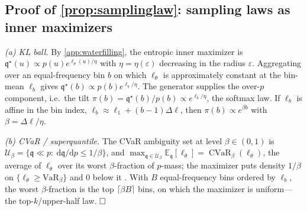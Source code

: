 \documentclass{article}
\theoremstyle{plain}
\theoremstyle{definition}
\theoremstyle{remark}
\DeclareMathOperator{\CVaR}{CVaR}
\newcommand{\E}{\mathbb{E}}
\newcommand{\state}{u}
\newcommand{\lossf}{\ell_\theta}
\newcommand{\pnat}{p}
\begin{document}
\subsection{Proof of \cref{prop:samplinglaw}: sampling laws as inner maximizers}\label{app:samplinglaw}
\emph{(a) KL ball.} By \cref{app:waterfilling}, the entropic inner maximizer is
$\mathfrak q^\star(\state)\propto\pnat(\state)e^{\lossf(\state)/\eta}$ with $\eta=\eta(\varepsilon)$
decreasing in the radius $\varepsilon$. Aggregating over an equal-frequency bin $b$ on which $\lossf$ is
approximately constant at the bin-mean $\ell_b$ gives $\mathfrak q^\star(b)\propto\pnat(b)e^{\ell_b/\eta}$.
The generator supplies the over-$\pnat$ component, i.e.\ the tilt $\pi(b)=\mathfrak q^\star(b)/\pnat(b)\propto
e^{\ell_b/\eta}$, the softmax law. If $\ell_b$ is affine in the bin index, $\ell_b\approx\ell_1+(b-1)\Delta\ell$,
then $\pi(b)\propto e^{\beta b}$ with $\beta=\Delta\ell/\eta$.

\emph{(b) CVaR / superquantile.} The CVaR ambiguity set at level $\beta\in(0,1)$ is
$\mathcal U_\beta=\{\mathfrak q\ll\pnat:\ \mathrm d\mathfrak q/\mathrm d\pnat\le 1/\beta\}$, and
$\max_{\mathfrak q\in\mathcal U_\beta}\E_{\mathfrak q}[\lossf]=\CVaR_\beta(\lossf)$, the average of $\lossf$
over its worst $\beta$-fraction of $\pnat$-mass; the maximizer puts density $1/\beta$ on
$\{\lossf\ge\mathrm{VaR}_\beta\}$ and $0$ below it \citep{rockafellar2000cvar}. With $B$ equal-frequency
bins ordered by $\ell_b$, the worst $\beta$-fraction is the top $\lceil\beta B\rceil$ bins, on which the
maximizer is uniform---the top-$k$/upper-half law. $\hfill\square$
\end{document}
